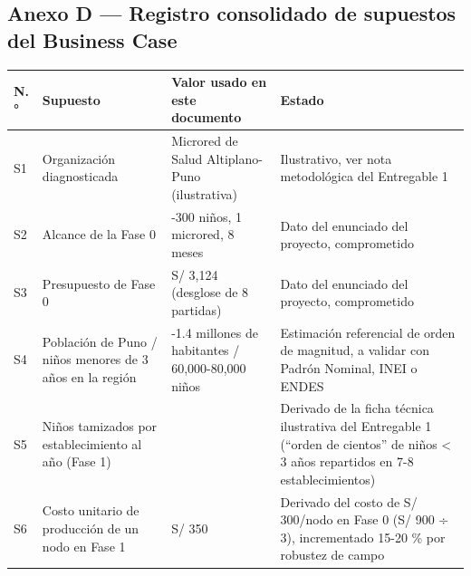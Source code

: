 \documentclass[11pt,a4paper]{article}
\begin{document}
\subsection{Anexo D --- Registro consolidado de supuestos del Business Case}\label{anexo-d-registro-consolidado-de-supuestos-del-business-case}

{\small
\begin{longtable}[]{@{}
  >{\raggedright\arraybackslash}p{}
  >{\raggedright\arraybackslash}p{}
  >{\raggedright\arraybackslash}p{}
  >{\raggedright\arraybackslash}p{}@{}}
\toprule\noalign{}
\begin{minipage}[b]{\linewidth}\raggedright
N.°
\end{minipage} & \begin{minipage}[b]{\linewidth}\raggedright
Supuesto
\end{minipage} & \begin{minipage}[b]{\linewidth}\raggedright
Valor usado en este documento
\end{minipage} & \begin{minipage}[b]{\linewidth}\raggedright
Estado
\end{minipage} \\
\midrule\noalign{}
\endhead
\bottomrule\noalign{}
\endlastfoot
S1 & Organización diagnosticada & Microred de Salud Altiplano-Puno (ilustrativa) & Ilustrativo, ver nota metodológica del Entregable 1 \\
S2 & Alcance de la Fase 0 & 150-300 niños, 1 microred, 8 meses & Dato del enunciado del proyecto, comprometido \\
S3 & Presupuesto de Fase 0 & S/ 3,124 (desglose de 8 partidas) & Dato del enunciado del proyecto, comprometido \\
S4 & Población de Puno / niños menores de 3 años en la región & 1.2-1.4 millones de habitantes / 60,000-80,000 niños & Estimación referencial de orden de magnitud, a validar con Padrón Nominal, INEI o ENDES \\
S5 & Niños tamizados por establecimiento al año (Fase 1) & 100 & Derivado de la ficha técnica ilustrativa del Entregable 1 (``orden de cientos'' de niños \textless{} 3 años repartidos en 7-8 establecimientos) \\
S6 & Costo unitario de producción de un nodo en Fase 1 & S/ 350 & Derivado del costo de S/ 300/nodo en Fase 0 (S/ 900 ÷ 3), incrementado 15-20 \% por robustez de campo \\

\end{longtable}}
\end{document}
